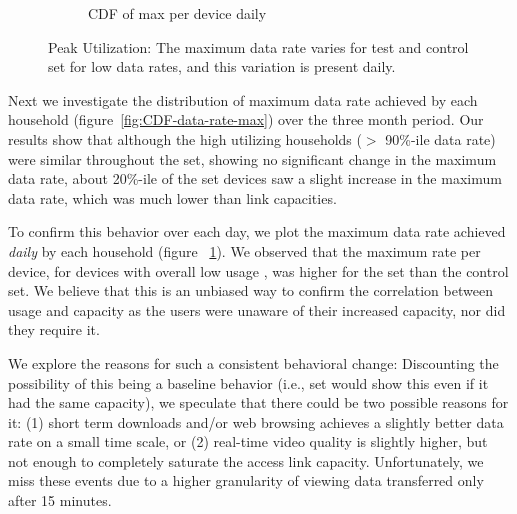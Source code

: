 \begin{figure}[ht!]
\begin{minipage}{0.90\linewidth}
\begin{subfigure}[b]{0.90\linewidth}
  \caption{CDF of max per device daily}
  \vspace{1em}
  \label{fig:CDF-data-rate-max-daily}
\end{subfigure}
\end{minipage}
\caption{Peak Utilization: The maximum data rate varies for test and control set for low data rates, and this variation is present daily.}
\label{fig:peak-utilization}
\end{figure}

Next we investigate the distribution of maximum data rate achieved by each household (figure~\ref{fig:CDF-data-rate-max}) over the three month period. Our results show that although the high utilizing households ($>$ 90\%-ile data rate) were similar throughout the set, showing no significant change in the maximum data rate, about 20\%-ile of the \test set devices saw a slight increase in the maximum data rate, which was much lower than link capacities. 

To confirm this behavior over each day, we plot the maximum data rate achieved \emph{daily} by each household (figure ~\ref{fig:CDF-data-rate-max-daily}). We observed that the maximum rate per device, for  devices with overall low usage , was higher for the \test set than the control set. We believe that this is an unbiased way to confirm the correlation between usage and capacity as the users were unaware of their increased capacity, nor did they require it. 

We explore the reasons for such a consistent behavioral change: Discounting the possibility of this being a baseline behavior (i.e., \test set would show this even if it had the same capacity), we speculate that there could be two possible reasons for it: (1) short term downloads and/or web browsing achieves a slightly better data rate on a small time scale, or (2) real-time video quality is slightly higher, but not enough to completely saturate the access link capacity. Unfortunately, we miss these events due to a higher granularity of viewing data transferred only after 15 minutes.

